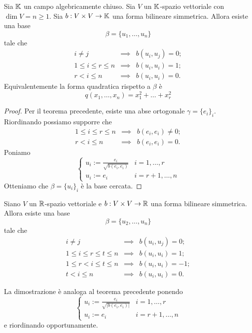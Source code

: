 \documentclass{article}     %
\begin{document}
\begin{shadedTheorem}[Sylvester I]
    Sia $\mathbb{K}$ un campo algebricamente chiuso. Sia $V$ un $\mathbb{K}$-spazio vettoriale con $\dim V=n\geq 1$. Sia $b:V\times V\to \mathbb{K}$ una forma bilineare simmetrica. Allora esiste una base 
    \[\beta=\{u_1, \dots, u_n\}\]
    tale che 
    \[\begin{array}{rcl}
        i\neq j & \implies  &b(u_i,u_j)=0;\\
        1\leq i\leq r\leq n &\implies &b(u_i,u_i)=1;\\
        r<i\leq n& \implies & b(u_i,u_i)=0.
    \end{array}\]
    Equivalentemente la forma quadratica rispetto a $\beta$ è 
    \[q(x_1, \dots, x_n)=x_1^2+\dots+ x_r^2\]
\end{shadedTheorem}
\begin{proof}
    Per il teorema precedente, esiste una abse ortogonale $\gamma=\{e_i\}_i$. Riordinando possiamo supporre che 
    \[\begin{array}{rcl}
        1\leq i\leq r\leq n &\implies &b(e_i,e_i)\neq 0;\\
        r<i\leq n& \implies & b(e_i,e_i)=0.
    \end{array}\]
    Poniamo 
    \[\begin{cases}
        u_i:=\frac{e_i}{\sqrt{b(e_i,e_i)}}& i=1,\dots, r\\
        u_i:=e_i& i=r+1, \dots, n
    \end{cases}\]
    Otteniamo che $\beta=\{u_i\}_i$ è la base cercata.
\end{proof}

\begin{shadedTheorem}[Sylvester II]
    Siano $V$ un $\mathbb{R}$-spazio vettoriale e $b:V\times V\to \mathbb{R}$ una forma bilineare simmetrica. Allora esiste una base 
    \[\beta=\{u_2, \dots, u_n\}\]
    tale che 
    \[\begin{array}{rcl}
        i\neq j & \implies  &b(u_i,u_j)=0;\\
        1\leq i\leq r\leq t\leq n &\implies &b(u_i,u_i)=1;\\
        1\leq r< i\leq t\leq n &\implies &b(u_i,u_i)=-1;\\
        t<i\leq n& \implies & b(u_i,u_i)=0.
    \end{array}\]
\end{shadedTheorem}
La dimostrazione è analoga al teorema precedente ponendo 
\[\begin{cases}
    u_i:=\frac{e_i}{\sqrt{|b(e_i,e_i)|}}& i=1,\dots, r\\
    u_i:=e_i& i=r+1, \dots, n
\end{cases}\]
e riordinando opportunamente.
\end{document}

